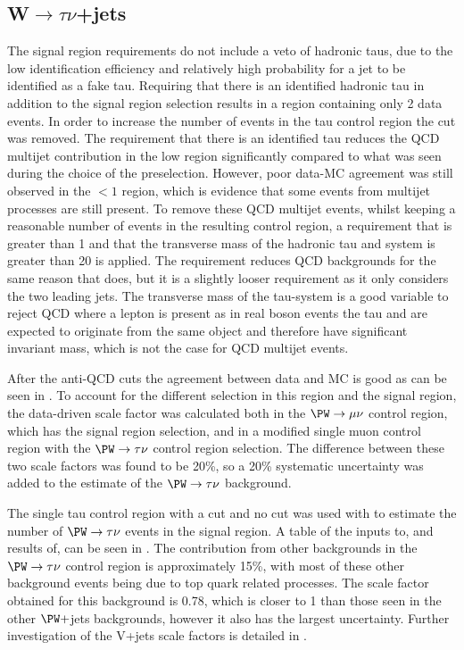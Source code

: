 \subsection{W$\rightarrow \tau\nu$+jets}
\label{sec:parkedwtaunu}
The signal region requirements do not include a veto of hadronic taus, due to the low identification efficiency and relatively high probability for a jet to be identified as a fake tau. Requiring that there is an identified hadronic tau in addition to the signal region selection results in a region containing only 2 data events. In order to increase the number of events in the tau control region the \jetmetdphi cut was removed. The requirement that there is an identified tau reduces the \ac{QCD} multijet contribution in the low \jetmetdphi region significantly compared to what was seen during the choice of the preselection. However, poor data-\ac{MC} agreement was still observed in the \jetmetdphi$<1$ region, which is evidence that some events from multijet processes are still present. To remove these \ac{QCD} multijet events, whilst keeping a reasonable number of events in the resulting control region, a requirement that \jetmetdphileading is greater than 1 and that the transverse mass of the hadronic tau and \MET system is greater than 20 \GeV is applied. The \jetmetdphileading requirement reduces \ac{QCD} backgrounds for the same reason that \jetmetdphi does, but it is a slightly looser requirement as it only considers the two leading jets. The transverse mass of the tau-\MET system is a good variable to reject \ac{QCD} where a lepton is present as in real \PW boson events the tau and \MET are expected to originate from the same object and therefore have significant invariant mass, which is not the case for \ac{QCD} multijet events.

After the anti-\ac{QCD} cuts the agreement between data and \ac{MC} is good as can be seen in . To account for the different \jetmetdphi selection in this region and the signal region, the data-driven scale factor was calculated both in the $\PW\rightarrow\mu\nu$ control region, which has the signal region \jetmetdphi selection, and in a modified single muon control region with the $\PW\rightarrow\tau\nu$ control region \jetmetdphi selection. The difference between these two scale factors was found to be 20\%, so a 20\% systematic uncertainty was added to the estimate of the $\PW\rightarrow\tau\nu$ background.

The single tau control region with a \jetmetdphileading cut and no \jetmetdphi cut was used with  to estimate the number of $\PW\rightarrow\tau\nu$ events in the signal region. A table of the inputs to, and results of,  can be seen in . The contribution from other backgrounds in the $\PW\rightarrow\tau\nu$ control region is approximately 15\%, with most of these other background events being due to top quark related processes. The scale factor obtained for this background is 0.78, which is closer to 1 than those seen in the other $\PW+$jets backgrounds, however it also has the largest uncertainty. Further investigation of the V+jets scale factors is detailed in .

